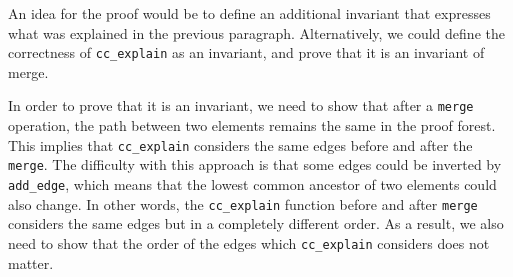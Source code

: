 An idea for the proof would be to define an additional invariant that expresses what was explained in the previous paragraph. Alternatively, we could define the correctness of \lstinline{cc_explain} as an invariant, and prove that it is an invariant of merge.

In order to prove that it is an invariant, we need to show that after a \lstinline{merge} operation, the path between two elements remains the same in the proof forest. This implies that \lstinline{cc_explain} considers the same edges before and after the \lstinline|merge|. The difficulty with this approach is that some edges could be inverted by \lstinline{add_edge}, which means that the lowest common ancestor of two elements could also change.
In other words, the \lstinline{cc_explain} function before and after \lstinline|merge| considers the same edges but in a completely different order. As a result, we also need to show that the order of the edges which \lstinline{cc_explain} considers does not matter.